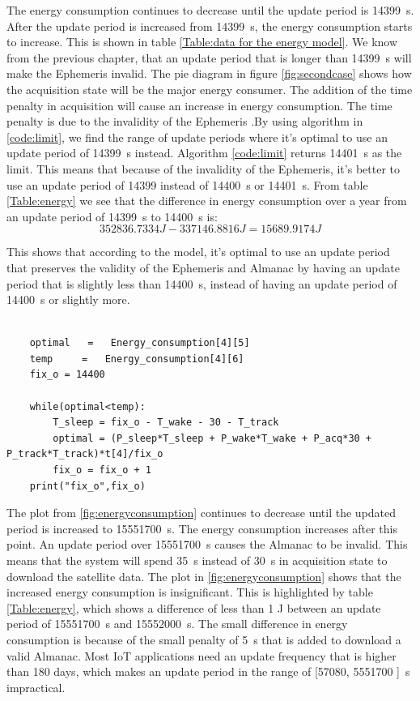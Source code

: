 The energy consumption continues to decrease until the update period is 14399 \,s. After the update period is increased from 14399 \,s, the energy consumption starts to increase. This is shown in table \ref{Table:data for the energy model}. We know from the previous chapter, that an update period that is longer than 14399 \,s will make the Ephemeris invalid. The pie diagram in figure \ref{fig:secondcase} shows how the acquisition state will be the major energy consumer. The addition of the time penalty in acquisition will cause an increase in energy consumption. The time penalty is due to the invalidity of the Ephemeris .By using algorithm in \ref{code:limit}, we find the range of update periods where it's optimal to use an update period of 14399 \,s instead. Algorithm \ref{code:limit} returns 14401 \,s as the limit. This means that because of the invalidity of the Ephemeris, it's better to use an update period of 14399 instead of 14400 \,s or 14401 \,s. From table \ref{Table:energy} we see that the difference in energy consumption over a year from an update period of 14399 \,s to 14400 \,s is:
\begin{equation}
352836.7334 J - 337146.8816 J = 15689.9174 J
\end{equation}

This shows that according to the model, it's optimal to use an update period that preserves the validity of the Ephemeris and Almanac by having an update period that is slightly less than 14400 \,s, instead of having an update period of 14400 \,s or slightly more.  


\lstset{language=Python}          %
\begin{lstlisting}[frame=single, caption= Code used for finding the beneficial limit]  % Start your code-block

    optimal   =   Energy_consumption[4][5]
    temp     =   Energy_consumption[4][6]
    fix_o = 14400

    while(optimal<temp):  
        T_sleep = fix_o - T_wake - 30 - T_track
        optimal = (P_sleep*T_sleep + P_wake*T_wake + P_acq*30 + P_track*T_track)*t[4]/fix_o
        fix_o = fix_o + 1
    print("fix_o",fix_o)

\end{lstlisting}
\label{code:limit}


The plot from \ref{fig:energyconsumption} continues to decrease until the updated period is increased to 15551700 \,s. The energy consumption increases after this point. An update period over 15551700 \,s causes the Almanac to be invalid. This means that the system will spend 35 \,s instead of 30 \,s in acquisition state to download the satellite data. The plot in \ref{fig:energyconsumption} shows that the increased energy consumption is insignificant. This is highlighted by table \ref{Table:energy}, which shows a difference of less than 1 J between an update period of 15551700 \,s and 15552000 \,s. The small difference in energy consumption is because of the small penalty of 5 \,s that is added to download a valid Almanac.  Most IoT applications need an update frequency that is higher than 180 days, which makes an update period in the range of [57080, 5551700 ] \,s impractical. 

